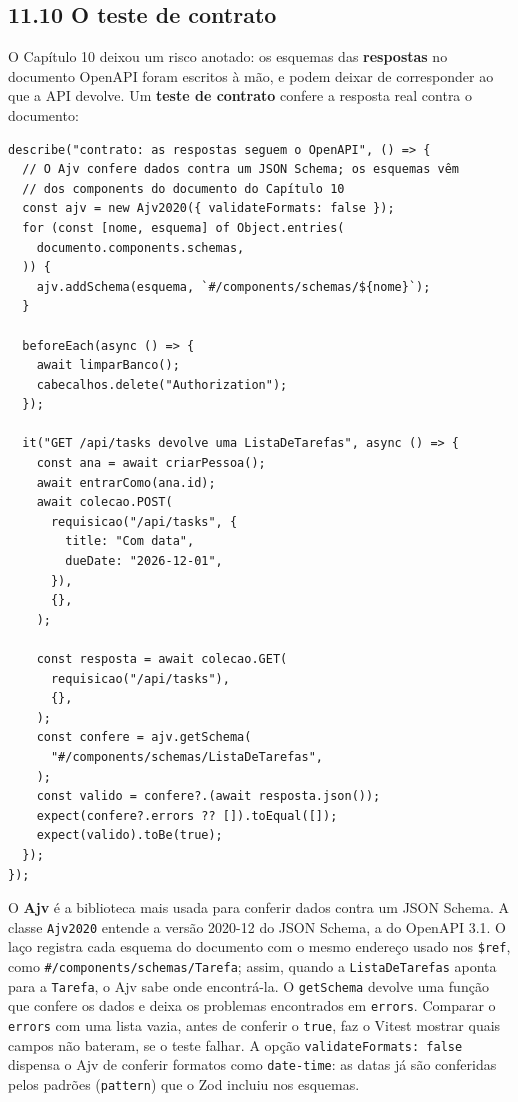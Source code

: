 \subsection{11.10 O teste de contrato}

O Capítulo 10 deixou um risco anotado: os esquemas das \textbf{respostas} no documento OpenAPI foram escritos à mão, e podem deixar de corresponder ao que a API devolve. Um \textbf{teste de contrato} confere a resposta real contra o documento:

\begin{codigo}
\begin{Verbatim}[breaklines=true, breaksymbolleft={}, fontsize=\footnotesize]
describe("contrato: as respostas seguem o OpenAPI", () => {
  // O Ajv confere dados contra um JSON Schema; os esquemas vêm
  // dos components do documento do Capítulo 10
  const ajv = new Ajv2020({ validateFormats: false });
  for (const [nome, esquema] of Object.entries(
    documento.components.schemas,
  )) {
    ajv.addSchema(esquema, `#/components/schemas/${nome}`);
  }

  beforeEach(async () => {
    await limparBanco();
    cabecalhos.delete("Authorization");
  });

  it("GET /api/tasks devolve uma ListaDeTarefas", async () => {
    const ana = await criarPessoa();
    await entrarComo(ana.id);
    await colecao.POST(
      requisicao("/api/tasks", {
        title: "Com data",
        dueDate: "2026-12-01",
      }),
      {},
    );

    const resposta = await colecao.GET(
      requisicao("/api/tasks"),
      {},
    );
    const confere = ajv.getSchema(
      "#/components/schemas/ListaDeTarefas",
    );
    const valido = confere?.(await resposta.json());
    expect(confere?.errors ?? []).toEqual([]);
    expect(valido).toBe(true);
  });
});
\end{Verbatim}
\end{codigo}

O \textbf{Ajv} é a biblioteca mais usada para conferir dados contra um JSON Schema. A classe \texttt{Ajv2020} entende a versão 2020-12 do JSON Schema, a do OpenAPI 3.1. O laço registra cada esquema do documento com o mesmo endereço usado nos \texttt{\$ref}, como \texttt{\#/components/schemas/Tarefa}; assim, quando a \texttt{ListaDeTarefas} aponta para a \texttt{Tarefa}, o Ajv sabe onde encontrá-la. O \texttt{getSchema} devolve uma função que confere os dados e deixa os problemas encontrados em \texttt{errors}. Comparar o \texttt{errors} com uma lista vazia, antes de conferir o \texttt{true}, faz o Vitest mostrar quais campos não bateram, se o teste falhar. A opção \texttt{validateFormats: false} dispensa o Ajv de conferir formatos como \texttt{date-time}: as datas já são conferidas pelos padrões (\texttt{pattern}) que o Zod incluiu nos esquemas.

